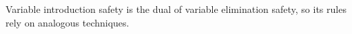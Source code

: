 \documentclass[acmsmall]{acmart}
\theoremstyle{definition}
\begin{document}
\noindent
Variable introduction safety is the dual of variable elimination safety, so its rules
rely on analogous techniques.

















\end{document}
